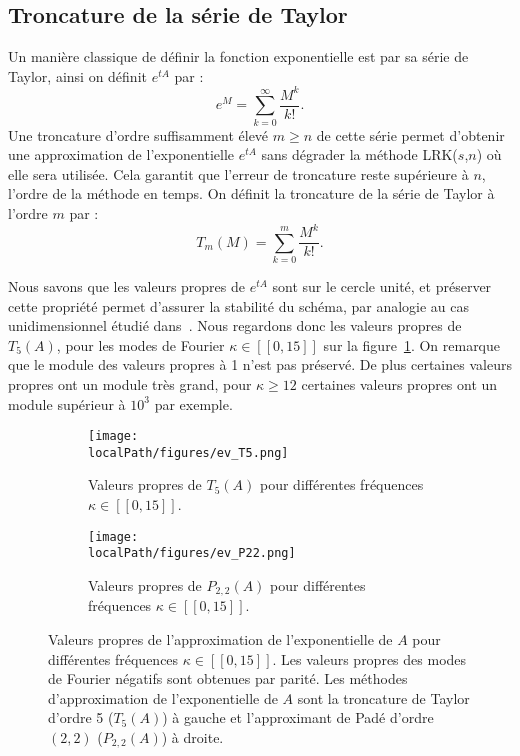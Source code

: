 \subsection{Troncature de la série de Taylor}

Un manière classique de définir la fonction exponentielle est par sa série de Taylor, ainsi on définit $e^{tA}$ par :
$$
  e^{M} = \sum_{k=0}^\infty \frac{M^k}{k!}.
$$
Une troncature d'ordre suffisamment élevé $m\geq n$ de cette série permet d'obtenir une approximation de l'exponentielle $e^{tA}$ sans dégrader la méthode LRK($s$,$n$) où elle sera utilisée. Cela garantit que l'erreur de troncature reste supérieure à $n$, l'ordre de la méthode en temps. On définit la troncature de la série de Taylor à l'ordre $m$ par :
$$
  T_m(M) = \sum_{k=0}^m \frac{M^k}{k!}.
$$

Nous savons que les valeurs propres de $e^{tA}$ sont sur le cercle unité, et préserver cette propriété permet d'assurer la stabilité du schéma, par analogie au cas unidimensionnel étudié dans~\cite{Crouseilles:2019b}. Nous regardons donc les valeurs propres de $T_5(A)$, pour les modes de Fourier $\kappa\in[\![0,15]\!]$ sur la figure~\ref{fig:ev:T5}. On remarque que le module des valeurs propres à 1 n'est pas préservé. De plus certaines valeurs propres ont un module très grand, pour $\kappa\geq12$ certaines valeurs propres ont un module supérieur à $10^3$ par exemple.

\begin{figure}
  \begin{subfigure}{.5\textwidth}
    \centering
    \texttt{[image: \\localPath/figures/ev\_T5.png]}
    \caption{Valeurs propres de $T_5(A)$ pour différentes fréquences $\kappa\in[\![0,15]\!]$.}
    \label{fig:ev:T5}
  \end{subfigure}
  \begin{subfigure}{.5\textwidth}
    \texttt{[image: \\localPath/figures/ev\_P22.png]}
    \caption{Valeurs propres de $P_{2,2}(A)$ pour différentes fréquences $\kappa\in[\![0,15]\!]$.}
    \label{fig:ev:P22}
  \end{subfigure}
  \caption{Valeurs propres de l'approximation de l'exponentielle de $A$ pour différentes fréquences $\kappa\in[\![0,15]\!]$. Les valeurs propres des modes de Fourier négatifs sont obtenues par parité. Les méthodes d'approximation de l'exponentielle de $A$ sont la troncature de Taylor d'ordre 5 ($T_5(A)$) à gauche et l'approximant de Padé d'ordre $(2,2)$ ($P_{2,2}(A)$) à droite.}
\end{figure}

